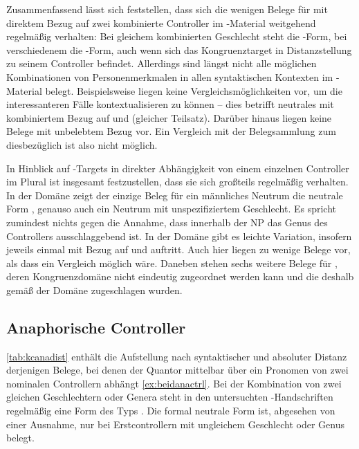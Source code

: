 Zusammenfassend lässt sich feststellen, dass sich die wenigen Belege für
 mit direktem Bezug auf zwei kombinierte Controller im
\citet{kc}-Material weitgehend regelmäßig verhalten: Bei gleichem
kombinierten Geschlecht steht die -Form, bei verschiedenem die
-Form, auch wenn sich das Kongruenztarget in Distanzstellung zu seinem
Controller befindet. Allerdings sind längst nicht alle möglichen Kombinationen
von Personenmerkmalen in allen syntaktischen Kontexten im
\citet{kc}-Material belegt. Beispielsweise liegen keine
Vergleichs\-möglich\-keiten vor, um die interessanteren Fälle kontextualisieren
zu können -- dies betrifft neutrales  mit kombiniertem Bezug auf
  und  (gleicher Teilsatz). Darüber
hinaus liegen keine Belege mit unbelebtem Bezug vor. Ein Vergleich mit der
Belegsammlung zum \CAO{} diesbezüglich ist also nicht möglich.

In Hinblick auf -Targets in direkter Abhängigkeit von einem
einzelnen Controller im Plural ist insgesamt festzustellen, dass sie sich
großteils regelmäßig verhalten. In der Domäne  zeigt der
einzige Beleg für ein männliches Neutrum die neutrale Form ,
genauso auch ein Neutrum mit unspezifiziertem Geschlecht. Es spricht zumindest
nichts gegen die Annahme, dass innerhalb der NP das Genus des Controllers
ausschlaggebend ist. In der Domäne  gibt es leichte
Variation, insofern jeweils einmal  mit Bezug auf
  und
  auftritt. Auch hier liegen zu wenige Belege vor,
als dass ein Vergleich möglich wäre.
Daneben stehen sechs weitere Belege für , deren Kongruenzdomäne
nicht eindeutig zugeordnet werden kann und die deshalb gemäß \citet[623]{ksw2} der Domäne  zugeschlagen wurden.

\subsection{Anaphorische Controller}

\cref{tab:kcanadist} enthält die Aufstellung nach syntaktischer und absoluter
Distanz derjenigen Belege, bei denen der Quantor  mittelbar
über ein Pronomen von zwei nominalen Controllern abhängt
\cref{ex:beidanactrl}. Bei der Kombination von zwei gleichen Geschlechtern
oder Genera steht in den untersuchten \citet{kc}-Handschriften
regelmäßig eine Form des Typs . Die formal neutrale Form
 ist, abgesehen von einer Ausnahme, nur bei Erstcontrollern mit
ungleichem Geschlecht oder Genus belegt.

